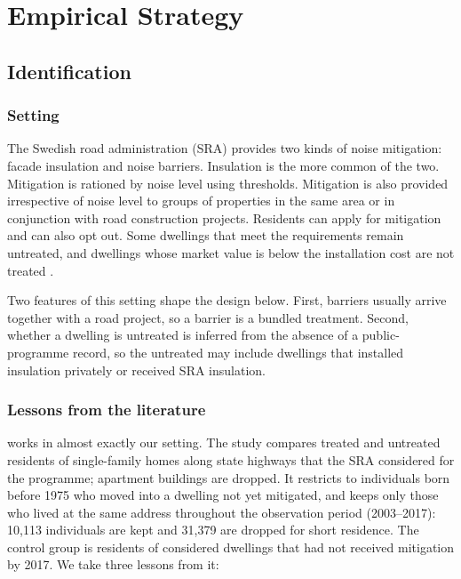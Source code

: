 \documentclass[11pt]{article}
\begin{document}
\section{Empirical Strategy}

\subsection{Identification}

\subsubsection{Setting}

The Swedish road administration (SRA) provides two kinds of noise mitigation: facade insulation and noise barriers. Insulation is the more common of the two. Mitigation is rationed by noise level using thresholds. Mitigation is also provided irrespective of noise level to groups of properties in the same area or in conjunction with road construction projects. Residents can apply for mitigation and can also opt out. Some dwellings that meet the requirements remain untreated, and dwellings whose market value is below the installation cost are not treated \autocite{lindgrenSoundEnvironmentHealth2021}.

Two features of this setting shape the design below. First, barriers usually arrive together with a road project, so a barrier is a bundled treatment. Second, whether a dwelling is untreated is inferred from the absence of a public-programme record, so the untreated may include dwellings that installed insulation privately or received SRA insulation.

\subsubsection{Lessons from the literature}

\textbf{\textcite{lindgrenSoundEnvironmentHealth2021}} works in almost exactly our setting. The study compares treated and untreated residents of single-family homes along state highways that the SRA considered for the programme; apartment buildings are dropped. It restricts to individuals born before 1975 who moved into a dwelling not yet mitigated, and keeps only those who lived at the same address throughout the observation period (2003--2017): 10,113 individuals are kept and 31,379 are dropped for short residence. The control group is residents of considered dwellings that had not received mitigation by 2017. We take three lessons from it:
\end{document}
